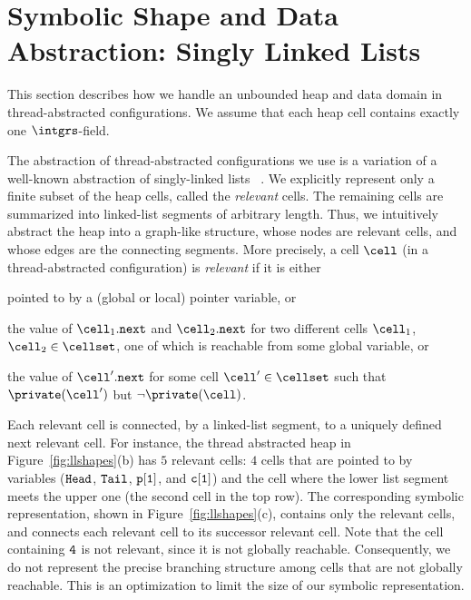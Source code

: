 \section{Symbolic Shape and Data Abstraction: Singly Linked Lists}
\label{sec:annotations}
This section describes how we handle an
unbounded heap and data domain in
thread-abstracted configurations.
We assume that each heap cell contains exactly one $\intgrs$-field.

The abstraction of thread-abstracted configurations we use is a variation of a
  well-known abstraction of singly-linked lists ~\cite{MYRS:Canonical}. We explicitly represent only a finite subset of the heap cells, called
the {\em relevant} cells. The remaining
cells are summarized into linked-list segments of arbitrary length.
Thus, we intuitively abstract the heap into a graph-like  structure, whose
nodes are relevant cells, and whose edges are the connecting segments.
More precisely, 
a cell $\cell$ (in a thread-abstracted configuration) is {\em relevant}
if it is either
\begin{inparaenum}[(i)]
\item
pointed to by a (global or local) pointer variable, or
\item
the value of
${\cell_1.{\tt next}}$ and  ${\cell_2.{\tt next}}$ for
two different cells $\cell_1$, $\cell_2 \in \cellset$,
one of which is reachable from some global variable, or
\item the value of ${\cell'.{\tt next}}$ for some cell $\cell' \in \cellset$
  such that $\private(\cell')$ but $\neg \private(\cell)$.
\end{inparaenum}
Each relevant cell is connected, by a linked-list segment, to a uniquely
defined next relevant cell.
For instance, the thread abstracted
heap in Figure~\ref{fig:llshapes}(b) has $5$ relevant
cells: $4$ cells that are pointed to by variables
(${\tt Head}$, ${\tt Tail}$, ${\tt p[1]}$, and ${\tt c[1]}$) and the cell where
the lower list segment meets the upper one (the second cell in the top row).
The corresponding symbolic representation, shown 
in Figure~\ref{fig:llshapes}(c), contains only the relevant cells, and
connects each relevant cell to its successor relevant cell. 
Note that the cell containing ${\tt 4}$ is not relevant,
since it is not globally reachable.
Consequently,
we do not represent the precise branching structure among cells that
are not globally reachable. This is an optimization to limit the
size of our symbolic representation.

